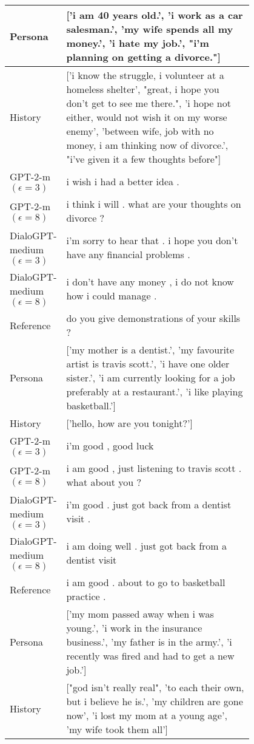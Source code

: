 \begin{table}[h]
\centering
\renewcommand{\arraystretch}{1.2}
\scriptsize
\begin{tabular}{l | p{0.8\linewidth}}
\toprule
Persona & ['i am 40 years old.', 'i work as a car salesman.', 'my wife spends all my money.', 'i hate my job.', "i'm planning on getting a divorce."] \\
 \hline
History & ['i know the struggle, i volunteer at a homeless shelter', "great, i hope you don't get to see me there.", 'i hope not either, would not wish it on my worse enemy', 'between wife, job with no money, i am thinking now of divorce.', "i've given it a few thoughts before"] \\
 \hline
GPT-2-m $(\epsilon=3)$ & i wish i had a better idea . \\
GPT-2-m $(\epsilon=8)$ & i think i will . what are your thoughts on divorce ? \\
DialoGPT-medium $(\epsilon=3)$ & i'm sorry to hear that . i hope you don't have any financial problems . \\
DialoGPT-medium $(\epsilon=8)$ & i don't have any money , i do not know how i could manage . \\
\hline
 Reference & do you give demonstrations of your skills ? \\
\midrule\midrule
Persona & ['my mother is a dentist.', 'my favourite artist is travis scott.', 'i have one older sister.', 'i am currently looking for a job preferably at a restaurant.', 'i like playing basketball.'] \\
 \hline
History & ['hello, how are you tonight?'] \\
 \hline
GPT-2-m $(\epsilon=3)$ & i'm good , good luck \\
GPT-2-m $(\epsilon=8)$ & i am good , just listening to travis scott . what about you ? \\
DialoGPT-medium $(\epsilon=3)$ & i'm good . just got back from a dentist visit . \\
DialoGPT-medium $(\epsilon=8)$ & i am doing well . just got back from a dentist visit \\
\hline
 Reference & i am good . about to go to basketball practice . \\
\midrule\midrule
Persona & ['my mom passed away when i was young.', 'i work in the insurance business.', 'my father is in the army.', 'i recently was fired and had to get a new job.'] \\
 \hline
History & ["god isn't really real", 'to each their own, but i believe he is.', 'my children are gone now', 'i lost my mom at a young age', 'my wife took them all'] \\

\end{tabular}
\end{table}
